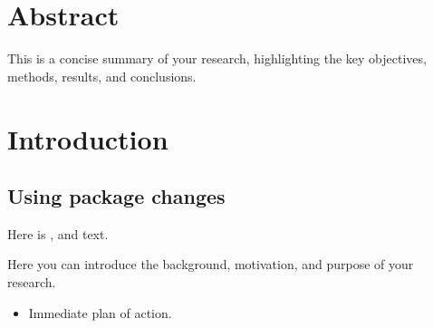 \documentclass{article}
\begin{document}
\newpage
\tableofcontents %
\newpage

\section*{Abstract}

This is a concise summary of your research, highlighting the key objectives, methods, results, and conclusions. 

\section{Introduction}

\subsection{Using package changes}

Here is ,  and  text. 

Here you can introduce the background, motivation, and purpose of your research. 

\begin{itemize}
  \item Immediate plan of action.
\end{itemize}

\end{document}
